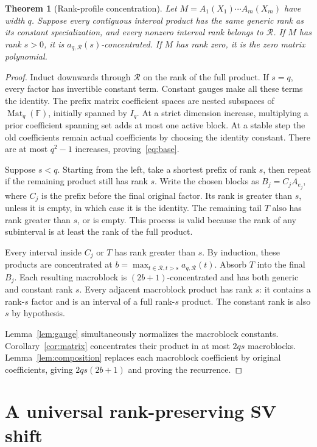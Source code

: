\documentclass[11pt]{article}
\newtheorem{theorem}{Theorem}[section]
\theoremstyle{definition}\newtheorem{definition}[theorem]{Definition}
\theoremstyle{remark}\newtheorem{remark}[theorem]{Remark}
\newcommand{\F}{\mathbb F}
\newcommand{\Mat}{\operatorname{Mat}}
\begin{document}
\begin{theorem}[Rank-profile concentration]\label{thm:profile}
Let $M=A_1(X_1)\cdots A_m(X_m)$ have width $q$. Suppose every contiguous
interval product has the same generic rank as its constant specialization,
and every nonzero interval rank belongs to $\mathcal R$. If $M$ has rank
$s>0$, it is $a_{q,\mathcal R}(s)$-concentrated. If $M$ has rank zero,
it is the zero matrix polynomial.
\end{theorem}
\begin{proof}
Induct downwards through $\mathcal R$ on the rank of the full product.
If $s=q$, every factor has invertible constant term. Constant gauges make
all these terms the identity. The prefix matrix coefficient spaces are
nested subspaces of $\Mat_q(\F)$, initially spanned by $I_q$. At a strict
dimension increase, multiplying a prior coefficient spanning set adds at
most one active block. At a stable step the old coefficients remain actual
coefficients by choosing the identity constant. There are at most $q^2-1$
increases, proving~\eqref{eq:base}.

Suppose $s<q$. Starting from the left, take a shortest prefix of rank $s$,
then repeat if the remaining product still has rank $s$. Write the chosen
blocks as $B_j=C_jA_{e_j}$, where $C_j$ is the prefix before the final
original factor. Its rank is greater than $s$, unless it is empty, in
which case it is the identity. The remaining tail $T$ also has rank
greater than $s$, or is empty. This process is valid because the rank of
any subinterval is at least the rank of the full product.

Every interval inside $C_j$ or $T$ has rank greater than $s$. By induction,
these products are concentrated at
$b=\max_{t\in\mathcal R,t>s}a_{q,\mathcal R}(t)$.
Absorb $T$ into the final $B_j$. Each resulting macroblock is
$(2b+1)$-concentrated and has both generic and constant rank $s$.
Every adjacent macroblock product has rank $s$: it contains a rank-$s$
factor and is an interval of a full rank-$s$ product. The constant rank is
also $s$ by hypothesis.

Lemma~\ref{lem:gauge} simultaneously normalizes the macroblock constants.
Corollary~\ref{cor:matrix} concentrates their product in at most $2qs$
macroblocks. Lemma~\ref{lem:composition} replaces each macroblock coefficient
by original coefficients, giving $2qs(2b+1)$ and proving the recurrence.
\end{proof}

\section{A universal rank-preserving SV shift}
\end{document}
